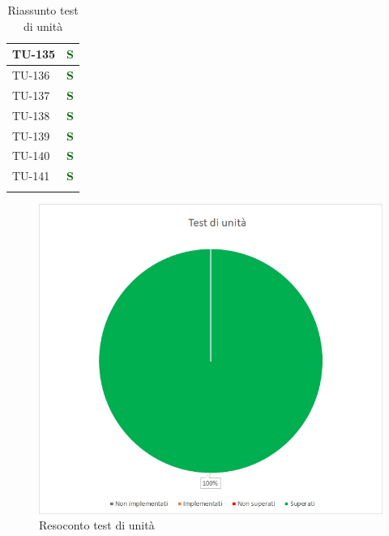 \begin{longtable}{|C{2.5cm}|C{2.5cm}|}
	\hline
	{TU-135} & \textcolor{darkgreen}{\textbf{S}}\\
	\hline
	{TU-136} & \textcolor{darkgreen}{\textbf{S}}\\
	\hline
	{TU-137} & \textcolor{darkgreen}{\textbf{S}}\\
	\hline
	{TU-138} & \textcolor{darkgreen}{\textbf{S}}\\
	\hline
	{TU-139} & \textcolor{darkgreen}{\textbf{S}}\\
	\hline
	{TU-140} & \textcolor{darkgreen}{\textbf{S}}\\
	\hline
	{TU-141} & \textcolor{darkgreen}{\textbf{S}}\\
	\hline
	\caption{Riassunto test di unità}
	\label{tabella:riassunto tu}
\end{longtable}
\renewcommand{\arraystretch}{1}
\begin{figure} [H]
	\centering
	\includegraphics[scale=0.7]{Img/TU}
	\caption{Resoconto test di unità}\label{}
\end{figure}


\pagebreak